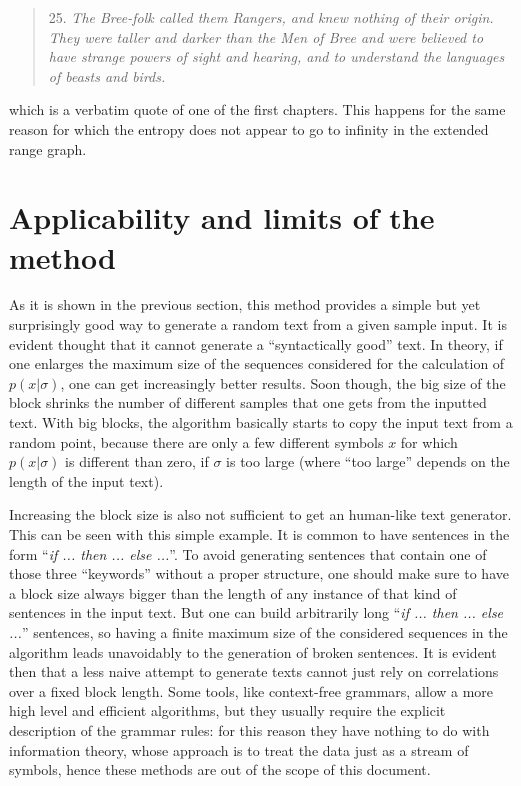 \documentclass[conference]{IEEEtran}
\begin{document}
\begin{quote}
25. \emph{The Bree-folk called them Rangers, and knew nothing of their origin. They were taller and darker than the Men of Bree and were believed to have strange powers of sight and hearing, and to understand the languages of beasts and birds.}
\end{quote}

which is a verbatim quote of one of the first chapters. This happens for the same reason for which the entropy does not appear to go to infinity in the extended range graph.

\section{Applicability and limits of the method}

As it is shown in the previous section, this method provides a simple but yet surprisingly good way to generate a random text from a given sample input. It is evident thought that it cannot generate a ``syntactically good'' text. In theory, if one enlarges the maximum size of the sequences considered for the calculation of $p(x|\sigma)$, one can get increasingly better results. Soon though, the big size of the block shrinks the number of different samples that one gets from the inputted text. With big blocks, the algorithm basically starts to copy the input text from a random point, because there are only a few different symbols $x$ for which $p(x|\sigma)$ is different than zero, if $\sigma$ is too large (where ``too large'' depends on the length of the input text).

Increasing the block size is also not sufficient to get an human-like text generator. This can be seen with this simple example. It is common to have sentences in the form ``\emph{if ... then ... else ...}''. To avoid generating sentences that contain one of those three ``keywords'' without a proper structure, one should make sure to have a block size always bigger than the length of any instance of that kind of sentences in the input text. But one can build arbitrarily long ``\emph{if ... then ... else ...}'' sentences, so having a finite maximum size of the considered sequences in the algorithm leads unavoidably to the generation of broken sentences. It is evident then that a less naive attempt to generate texts cannot just rely on correlations over a fixed block length. Some tools, like context-free grammars, allow a more high level and efficient algorithms, but they usually require the explicit description of the grammar rules: for this reason they have nothing to do with information theory, whose approach is to treat the data just as a stream of symbols, hence these methods are out of the scope of this document.
\end{document}
